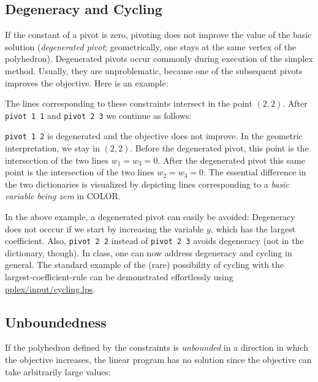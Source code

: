 \documentclass[ukenglish,a4]{article}
\begin{document}
\subsection{Degeneracy and Cycling}\label{sec:cycling}
If the constant of a pivot is zero, pivoting does not improve the value of the basic solution (\emph{degenerated pivot}; geometrically, one stays at the same vertex of the polyhedron). Degenerated pivots occur commonly during execution of the simplex method. Usually, they are unproblematic, because one of the subsequent pivots improves
the objective. Here is an example:
\begin{alltt}

\end{alltt}
The lines corresponding to these constraints intersect in the point $(2,2)$.
After \texttt{pivot 1 1} and \texttt{pivot 2 3} we continue as follows:
\begin{alltt}

\end{alltt}
\texttt{pivot 1 2} is degenerated and the objective does not improve.
In the geometric interpretation, we stay in $(2,2)$. Before the degenerated pivot,
this point is the intersection of the two lines $w_1 = w_3 = 0$. After the degenerated pivot
this same point  is the intersection of the two lines $w_2 = w_3 = 0$.
The essential difference in the two dictionaries is visualized by depicting
lines corresponding to a \emph{basic variable being zero} in COLOR. %

In the above example, a degenerated pivot can easily be avoided:
Degeneracy does not occcur if we start by increasing the
variable $y$, which has the largest coefficient. Also, \texttt{pivot 2 2} 
instead of \texttt{pivot 2 3} avoids degeneracy
(not in the dictionary, though).
In class, one can now address degeneracy and cycling in general. 
The standard example \cite{Chvatal,Vanderbei} of the (rare) possibility of 
cycling with the largest-coefficient-rule can be demonstrated 
effortlessly using \url{pplex/input/cycling.lps}.

\subsection{Unboundedness}\label{sec:unbounded}
If the polyhedron defined by the constraints is 
\emph{unbounded} in a direction in which the objective increases, the linear program has no solution
since the objective can take arbitrarily large values:
\end{document}
